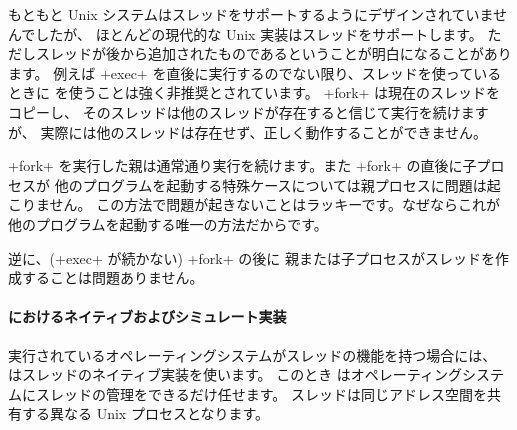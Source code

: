 もともと Unix システムはスレッドをサポートするようにデザインされていませんでしたが、
ほとんどの現代的な Unix 実装はスレッドをサポートします。
ただしスレッドが後から追加されたものであるということが明白になることがあります。
例えば \ml+exec+ を直後に実行するのでない限り、スレッドを使っているときに
 を使うことは強く非推奨とされています。
\ml+fork+ は現在のスレッドをコピーし、
そのスレッドは他のスレッドが存在すると信じて実行を続けますが、
実際には他のスレッドは存在せず、正しく動作することができません。

\ml+fork+ を実行した親は通常通り実行を続けます。また \ml+fork+ の直後に子プロセスが
他のプログラムを起動する特殊ケースについては親プロセスに問題は起こりません。
この方法で問題が起きないことはラッキーです。なぜならこれが
他のプログラムを起動する唯一の方法だからです。

逆に、(\ml+exec+ が続かない) \ml+fork+ の後に
親または子プロセスがスレッドを作成することは問題ありません。

\paragraph {\label{sec/thread-implementation} {\ocaml} におけるネイティブおよびシミュレート実装}

実行されているオペレーティングシステムがスレッドの機能を持つ場合には、
\ocaml はスレッドのネイティブ実装を使います。
このとき \ocaml はオペレーティングシステムにスレッドの管理をできるだけ任せます。
スレッドは同じアドレス空間を共有する異なる Unix プロセスとなります。

